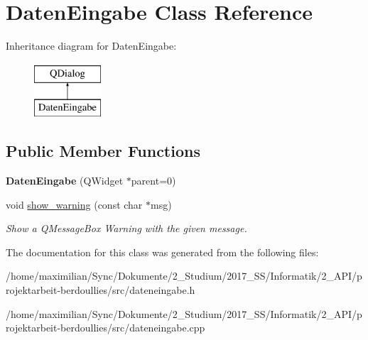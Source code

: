 \hypertarget{class_daten_eingabe}{}\section{Daten\+Eingabe Class Reference}
\label{class_daten_eingabe}
Inheritance diagram for Daten\+Eingabe\+:\begin{figure}[H]
\begin{center}
\leavevmode
\includegraphics[height=2.000000cm]{class_daten_eingabe}
\end{center}
\end{figure}
\subsection*{Public Member Functions}
\begin{DoxyCompactItemize}
\item 
\mbox{\label{class_daten_eingabe_af44ce7d33fc9e87a6fe59d3b5f6db0ed}} 
{\bfseries Daten\+Eingabe} (Q\+Widget $\ast$parent=0)
\item 
\mbox{\label{class_daten_eingabe_a8c9a23632805bea1862a818cf0f0f733}} 
void \hyperlink{class_daten_eingabe_a8c9a23632805bea1862a818cf0f0f733}{show\+\_\+warning} (const char $\ast$msg)
\begin{DoxyCompactList}\small\item\em Show a Q\+Message\+Box Warning with the given message. \end{DoxyCompactList}\end{DoxyCompactItemize}


The documentation for this class was generated from the following files\+:\begin{DoxyCompactItemize}
\item 
/home/maximilian/\+Sync/\+Dokumente/2\+\_\+\+Studium/2017\+\_\+\+S\+S/\+Informatik/2\+\_\+\+A\+P\+I/projektarbeit-\/berdoullies/src/dateneingabe.\+h\item 
/home/maximilian/\+Sync/\+Dokumente/2\+\_\+\+Studium/2017\+\_\+\+S\+S/\+Informatik/2\+\_\+\+A\+P\+I/projektarbeit-\/berdoullies/src/dateneingabe.\+cpp\end{DoxyCompactItemize}
